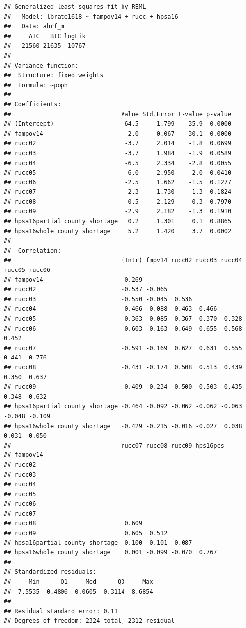 \documentclass[
]{article}
\begin{document}
\begin{verbatim}
## Generalized least squares fit by REML
##   Model: lbrate1618 ~ fampov14 + rucc + hpsa16 
##   Data: ahrf_m 
##     AIC   BIC logLik
##   21560 21635 -10767
## 
## Variance function:
##  Structure: fixed weights
##  Formula: ~popn 
## 
## Coefficients:
##                               Value Std.Error t-value p-value
## (Intercept)                    64.5     1.799    35.9  0.0000
## fampov14                        2.0     0.067    30.1  0.0000
## rucc02                         -3.7     2.014    -1.8  0.0699
## rucc03                         -3.7     1.984    -1.9  0.0589
## rucc04                         -6.5     2.334    -2.8  0.0055
## rucc05                         -6.0     2.950    -2.0  0.0410
## rucc06                         -2.5     1.662    -1.5  0.1277
## rucc07                         -2.3     1.730    -1.3  0.1824
## rucc08                          0.5     2.129     0.3  0.7970
## rucc09                         -2.9     2.182    -1.3  0.1910
## hpsa16partial county shortage   0.2     1.301     0.1  0.8865
## hpsa16whole county shortage     5.2     1.420     3.7  0.0002
## 
##  Correlation: 
##                               (Intr) fmpv14 rucc02 rucc03 rucc04 rucc05 rucc06
## fampov14                      -0.269                                          
## rucc02                        -0.537 -0.065                                   
## rucc03                        -0.550 -0.045  0.536                            
## rucc04                        -0.466 -0.088  0.463  0.466                     
## rucc05                        -0.363 -0.085  0.367  0.370  0.328              
## rucc06                        -0.603 -0.163  0.649  0.655  0.568  0.452       
## rucc07                        -0.591 -0.169  0.627  0.631  0.555  0.441  0.776
## rucc08                        -0.431 -0.174  0.508  0.513  0.439  0.350  0.637
## rucc09                        -0.409 -0.234  0.500  0.503  0.435  0.348  0.632
## hpsa16partial county shortage -0.464 -0.092 -0.062 -0.062 -0.063 -0.048 -0.109
## hpsa16whole county shortage   -0.429 -0.215 -0.016 -0.027  0.038  0.031 -0.050
##                               rucc07 rucc08 rucc09 hps16pcs
## fampov14                                                   
## rucc02                                                     
## rucc03                                                     
## rucc04                                                     
## rucc05                                                     
## rucc06                                                     
## rucc07                                                     
## rucc08                         0.609                       
## rucc09                         0.605  0.512                
## hpsa16partial county shortage -0.100 -0.101 -0.087         
## hpsa16whole county shortage    0.001 -0.099 -0.070  0.767  
## 
## Standardized residuals:
##     Min      Q1     Med      Q3     Max 
## -7.5535 -0.4806 -0.0605  0.3114  8.6854 
## 
## Residual standard error: 0.11 
## Degrees of freedom: 2324 total; 2312 residual
\end{verbatim}
\end{document}
